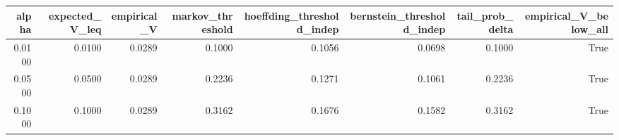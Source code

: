 \begin{tabular}{rrrrrrrr}
\toprule
alpha & expected\_V\_leq & empirical\_V & markov\_threshold & hoeffding\_threshold\_indep & bernstein\_threshold\_indep & tail\_prob\_delta & empirical\_V\_below\_all \\
\midrule
0.0100 & 0.0100 & 0.0289 & 0.1000 & 0.1056 & 0.0698 & 0.1000 & True \\
0.0500 & 0.0500 & 0.0289 & 0.2236 & 0.1271 & 0.1061 & 0.2236 & True \\
0.1000 & 0.1000 & 0.0289 & 0.3162 & 0.1676 & 0.1582 & 0.3162 & True \\
\bottomrule
\end{tabular}
